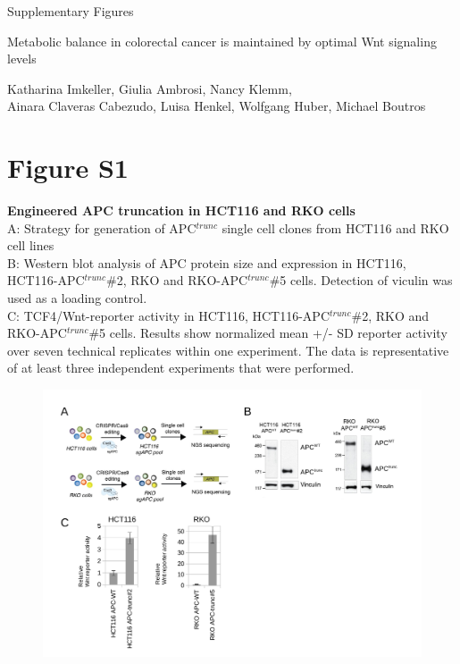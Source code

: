 \documentclass[11pt,a4paper,titlepage]{article}
\begin{document}
\begin{center}


\Huge{Supplementary Figures}

\vspace{2cm}
\huge{Metabolic balance in colorectal cancer is maintained by 
optimal Wnt signaling levels}

\vspace{2cm}
\large{Katharina Imkeller, Giulia Ambrosi, Nancy Klemm,\\Ainara Claveras Cabezudo, 
Luisa Henkel, Wolfgang Huber, Michael Boutros}
\end{center}

\titlepage

\pagebreak

\section*{Figure S1}

\textbf{Engineered APC truncation in HCT116 and RKO cells}\\
A: Strategy for generation of APC$^{trunc}$ single cell clones from HCT116 and RKO cell lines\\
B: Western blot analysis of APC protein size and expression in HCT116, HCT116-APC$^{trunc}$\#2, RKO and RKO-APC$^{trunc}$\#5 cells. Detection of viculin was used as a loading control.\\
C: TCF4/Wnt-reporter activity in HCT116, HCT116-APC$^{trunc}$\#2, RKO and RKO-APC$^{trunc}$\#5 cells. Results show normalized mean +/- SD reporter activity over seven technical replicates within one experiment. The data is representative of at least three independent experiments that were performed.

\begin{figure}[h]
\includegraphics[scale=0.9]{FigureS1.pdf} 

\end{figure}
\end{document}
